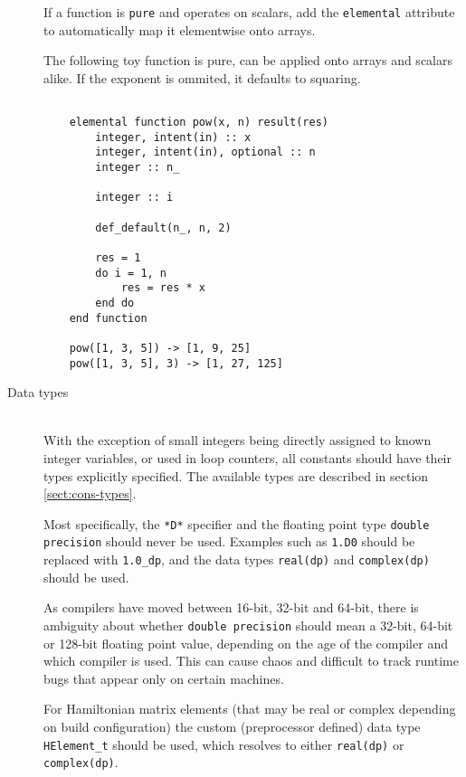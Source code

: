 \documentclass[a4paper,notitlepage]{scrreprt}
\newcommand\headitem[1]{\needspace{1.5\baselineskip}\item[{\boldmath #1 \nopagebreak}] \hfill \\ \nopagebreak}
\let\code\lstinline
\begin{document}
\begin{description}
    If a function is \code{pure} and operates on scalars, add
    the \code{elemental} attribute to automatically map it elementwise
    onto arrays.

    The following toy function is pure, can be applied onto arrays
    and scalars alike.
    If the exponent is ommited, it defaults to squaring.

    \begin{lstlisting}

    elemental function pow(x, n) result(res)
        integer, intent(in) :: x
        integer, intent(in), optional :: n
        integer :: n_

        integer :: i

        def_default(n_, n, 2)

        res = 1
        do i = 1, n
            res = res * x
        end do
    end function

    pow([1, 3, 5]) -> [1, 9, 25]
    pow([1, 3, 5], 3) -> [1, 27, 125]

    \end{lstlisting}

	\headitem{Data types}
		With the exception of small integers being directly assigned to known
		integer variables, or used in loop counters, all constants should have
		their types explicitly specified. The available types are described
		in section \ref{sect:cons-types}.

		Most specifically, the \code{*D*} specifier and the floating
		point type \code{double precision} should never be used. Examples
		such as \code{1.D0} should be replaced with \code{1.0_dp},
		and the data types \code{real(dp)} and \code{complex(dp)}
		should be used.

		As compilers have moved between 16-bit, 32-bit and 64-bit, there is
		ambiguity about whether \code{double precision} should mean a
		32-bit, 64-bit or 128-bit floating point value, depending on the age
		of the compiler and which compiler is used. This can cause chaos and
		difficult to track runtime bugs that appear only on certain machines.

		For Hamiltonian matrix elements (that may be real or complex depending
		on build configuration) the custom (preprocessor defined) data type
		\code{HElement_t} should be used, which resolves to either
		\code{real(dp)} or \code{complex(dp)}.



\end{description}
\end{document}
